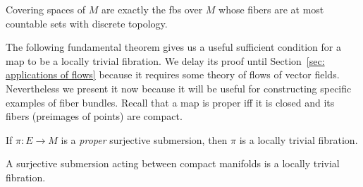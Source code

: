 \begin{example}
    Covering spaces of $M$ are exactly the \glspl{fb} over $M$ whose fibers are at most countable sets with discrete topology.
\end{example}

The following fundamental theorem gives us a useful sufficient condition for a map to be a locally trivial fibration. We delay its proof until Section~\ref{sec: applications of flows} because it requires some theory of flows of vector fields. Nevertheless we present it now because it will be useful for constructing specific examples of fiber bundles. Recall that a map is proper iff it is closed and its fibers (preimages of points) are compact.

\begin{thm}\label{thm Ehresmann}
    If $\pi:E\to M$ is a \emph{proper} surjective submersion, then $\pi$ is a locally trivial fibration.
\end{thm}

\begin{cor}
    A surjective submersion acting between compact manifolds is a locally trivial fibration.
\end{cor}


